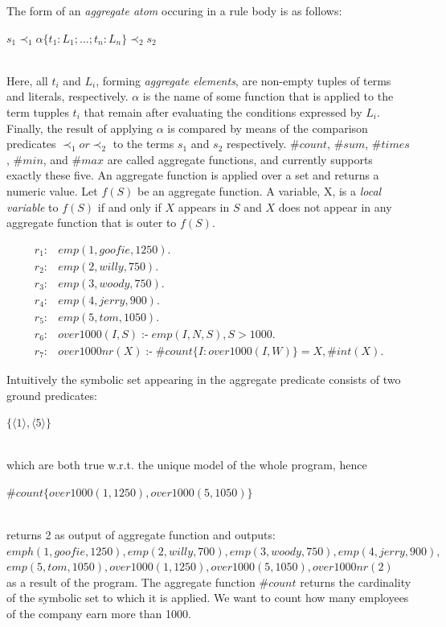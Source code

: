 \documentclass[a4paper, titlepage]{article}
\DeclareMathOperator{\leftimpl}{:-}
\begin{document}
The form of an \emph{aggregate atom} occuring in a rule 
body is as follows:\\ \centerline{$s_1 \prec_1 \alpha \{ 
t_1:L_1;...;t_n:L_n\} \prec_2 s_2$} 
\\ Here, all $\mathit{t_i}$ and $\mathit{L_i}$, forming 
\emph{aggregate elements}, are non-empty tuples of terms 
and literals, respectively. $\alpha$ is the name of some 
function that is applied to the term tupples \texttt{$t_i$} 
that remain after evaluating the conditions expressed by 
$L_i$. Finally,  the result of applying $\alpha$ is 
compared by means of the comparison predicates $\prec_1 or 
\prec_2$ to the terms $s_1$ and $s_2$ respectively. 
$\mathit{\#count}$, $\mathit{\#sum}$, $\mathit{\#times}$, 
$\mathit{\#min}$, and $\mathit{\#max}$ are called aggregate 
functions, and \dlvhex{} currently supports exactly these 
five. An aggregate function is applied over a set and 
returns a numeric value. Let $f(S)$ be an aggregate 
function. A variable, X, is a \emph{local variable} to 
$f(S)$ if and only if $X$ appears in $S$ and $X$ does not 
appear in any aggregate function that is outer to $f(S)$.
\begin{exmp}
\begin{align*}
r_1\colon& emp(1,goofie,1250).\\
r_2\colon& emp(2,willy,750).\\
r_3\colon& emp(3,woody,750).\\
r_4\colon& emp(4,jerry,900).\\
r_5\colon& emp(5,tom,1050). \\
r_6\colon& over1000(I,S) \leftimpl emp(I,N,S), S > 1000.\\
r_7\colon& over1000nr(X) \leftimpl \#count\{I : 
over1000(I,W)\} = X, \#int(X).
\end{align*}
\end{exmp}
Intuitively the symbolic set appearing in the aggregate 
predicate consists of two ground predicates: \\ 
\centerline{$\{\langle 1 \rangle,\langle 5 \rangle\}$}
\\which are both true w.r.t. the unique model of the whole 
program, hence \\ \centerline{$ 
\#count\{over1000(1,1250),over1000(5,1050)\}$} \\returns 2 
as output of aggregate function and outputs:\\
$\mathit{emph(1,goofie,1250),emp(2,willy,700),emp(3,woody,750),emp(4,jerry,900),}$
\\
$\mathit{emp(5,tom,1050),over1000(1,1250),over1000(5,1050),over1000nr(2)}$
\\as a result of the program.
The aggregate function $\mathit{\#count}$ returns the 
cardinality of the symbolic set to which it is applied. We 
want to count how many employees of the company earn more 
than 1000. 
\end{document}
